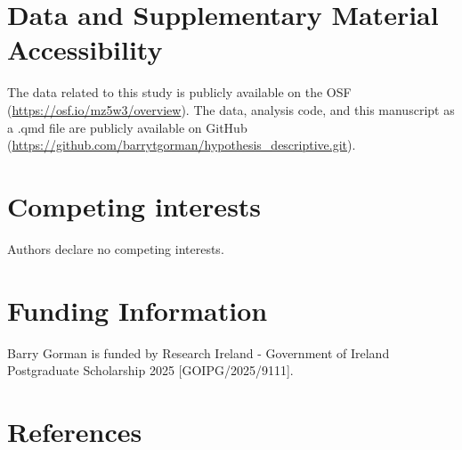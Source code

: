 \documentclass[
]{article}
\begin{document}
\section{Data and Supplementary Material
Accessibility}\label{data-and-supplementary-material-accessibility}

The data related to this study is publicly available on the OSF
(\url{https://osf.io/mz5w3/overview}). The data, analysis code, and this
manuscript as a .qmd file are publicly available on GitHub
(\url{https://github.com/barrytgorman/hypothesis_descriptive.git}).

\section{Competing interests}\label{competing-interests}

Authors declare no competing interests.

\section{Funding Information}\label{funding-information}

Barry Gorman is funded by Research Ireland - Government of Ireland
Postgraduate Scholarship 2025 {[}GOIPG/2025/9111{]}.

\section*{References}\label{bibliography}
\end{document}
